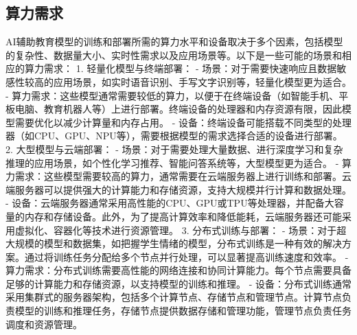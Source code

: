 \subsection{算力需求}
AI辅助教育模型的训练和部署所需的算力水平和设备取决于多个因素，包括模型的复杂性、数据量大小、实时性需求以及应用场景等。以下是一些可能的场景和相应的算力需求：
1. 轻量化模型与终端部署：
  - 场景：对于需要快速响应且数据敏感性较高的应用场景，如实时语音识别、手写文字识别等，轻量化模型更为适合。
  - 算力需求：这些模型通常需要较低的算力，以便于在终端设备（如智能手机、平板电脑、教育机器人等）上进行部署。终端设备的处理器和内存资源有限，因此模型需要优化以减少计算量和内存占用。
  - 设备：终端设备可能搭载不同类型的处理器（如CPU、GPU、NPU等），需要根据模型的需求选择合适的设备进行部署。
2. 大型模型与云端部署：
  - 场景：对于需要处理大量数据、进行深度学习和复杂推理的应用场景，如个性化学习推荐、智能问答系统等，大型模型更为适合。
  - 算力需求：这些模型需要较高的算力，通常需要在云端服务器上进行训练和部署。云端服务器可以提供强大的计算能力和存储资源，支持大规模并行计算和数据处理。
  - 设备：云端服务器通常采用高性能的CPU、GPU或TPU等处理器，并配备大容量的内存和存储设备。此外，为了提高计算效率和降低能耗，云端服务器还可能采用虚拟化、容器化等技术进行资源管理。
3. 分布式训练与部署：
  - 场景：对于超大规模的模型和数据集，如把握学生情绪的模型，分布式训练是一种有效的解决方案。通过将训练任务分配给多个节点并行处理，可以显著提高训练速度和效率。
  - 算力需求：分布式训练需要高性能的网络连接和协同计算能力。每个节点需要具备足够的计算能力和存储资源，以支持模型的训练和推理。
  - 设备：分布式训练通常采用集群式的服务器架构，包括多个计算节点、存储节点和管理节点。计算节点负责模型的训练和推理任务，存储节点提供数据存储和管理功能，管理节点负责任务调度和资源管理。